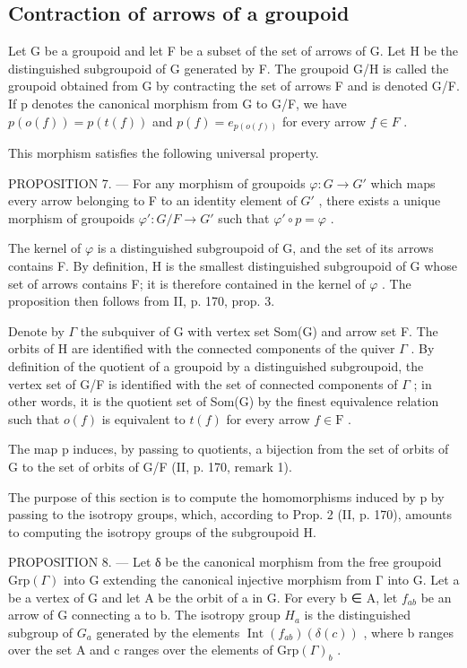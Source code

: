 \subsection{Contraction of arrows of a groupoid}

Let G be a groupoid and let F be a subset of the set of arrows of G. Let H be the distinguished subgroupoid of G generated by F. The groupoid G/H is called the groupoid obtained from G by contracting the set of arrows F and is denoted G/F. If p denotes the canonical morphism from G to G/F, we have \(p(o(f)) = p(t(f))\) and \(p(f) = e_{p(o(f))}\) for every arrow \(f \in F\) .

This morphism satisfies the following universal property.

PROPOSITION 7. --- For any morphism of groupoids \(\varphi\colon G\to G'\) which maps every arrow belonging to F to an identity element of \(G'\) , there exists a unique morphism of groupoids \(\varphi'\colon G/F\to G'\) such that \(\varphi'\circ p=\varphi\) .

The kernel of \(\varphi\) is a distinguished subgroupoid of G, and the set of its arrows contains F. By definition, H is the smallest distinguished subgroupoid of G whose set of arrows contains F; it is therefore contained in the kernel of \(\varphi\) . The proposition then follows from II, p. 170, prop. 3.

Denote by \(\Gamma\) the subquiver of G with vertex set Som(G) and arrow set F. The orbits of H are identified with the connected components of the quiver \(\Gamma\) . By definition of the quotient of a groupoid by a distinguished subgroupoid, the vertex set of G/F is identified with the set of connected components of \(\Gamma\) ; in other words, it is the quotient set of Som(G) by the finest equivalence relation such that \(o(f)\) is equivalent to \(t(f)\) for every arrow \(f \in \mathrm{F}\) .

The map p induces, by passing to quotients, a bijection from the set of orbits of G to the set of orbits of G/F (II, p. 170, remark 1).

The purpose of this section is to compute the homomorphisms induced by p by passing to the isotropy groups, which, according to Prop. 2 (II, p. 170), amounts to computing the isotropy groups of the subgroupoid H.

PROPOSITION 8. --- Let δ be the canonical morphism from the free groupoid \(\mathrm{Grp}(\Gamma)\) into G extending the canonical injective morphism from Γ into G. Let a be a vertex of G and let A be the orbit of a in G. For every b ∈ A, let \(f_{ab}\) be an arrow of G connecting a to b. The isotropy group \(H_{a}\) is the distinguished subgroup of \(G_{a}\) generated by the elements \(\operatorname{Int}(f_{ab})(\delta(c))\) , where b ranges over the set A and c ranges over the elements of \(\mathrm{Grp}(\Gamma)_{b}\) .

